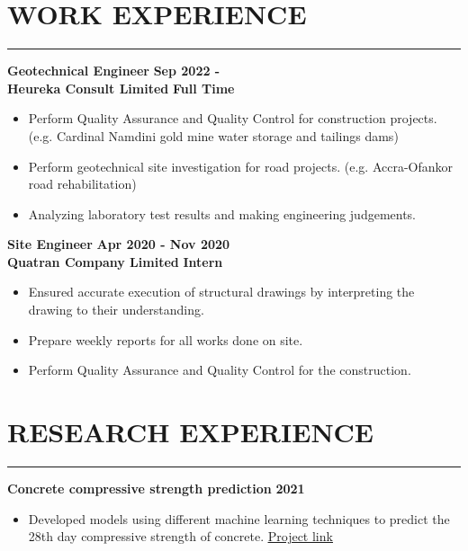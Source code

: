 \documentclass[letterpaper, 12pt]{article}
\newcommand{\cvsection}[1]{
	
	\section*{#1}	
	\rule[20pt]{\linewidth}{0.5pt} %

}
\newcommand{\verticalSpace}{4pt}
\newcommand{\itemizeMargin}{11pt}
\begin{document}
	
	\cvsection{WORK EXPERIENCE}
	
	\textbf{Geotechnical Engineer} \hfill \textbf{Sep 2022 - } \\ [\verticalSpace]
	\textbf{Heureka Consult Limited} \hfill \textbf{Full Time}
	
	\begin{itemize}[leftmargin=\itemizeMargin]
		
		\item Perform Quality Assurance and Quality Control for construction projects. (e.g. Cardinal Namdini gold mine water storage and tailings dams)
		\item Perform geotechnical site investigation for road projects. (e.g. Accra-Ofankor road rehabilitation)
		\item Analyzing laboratory test results and making engineering judgements.
		
	\end{itemize} 
	
	\textbf{Site Engineer} \hfill \textbf{Apr 2020 - Nov 2020} \\ [\verticalSpace]
	\textbf{Quatran Company Limited} \hfill \textbf{Intern}
	
	\begin{itemize}[leftmargin=\itemizeMargin]
		
		\item Ensured accurate execution of structural drawings by interpreting the drawing to their understanding.
		\item Prepare weekly reports for all works done on site.
		\item Perform Quality Assurance and Quality Control for the construction.

	\end{itemize}
	
	
	\cvsection{RESEARCH EXPERIENCE}
	
	\textbf{Concrete compressive strength prediction} \hfill \textbf{2021}
	\begin{itemize}[leftmargin=\itemizeMargin]
		
		\item Developed models using different machine learning techniques to predict the 28th day compressive strength of concrete. \href{https://www.github.com/patrickboateng/strength-prediction}{\underline{Project link}}
		
	\end{itemize}
	
\end{document}
